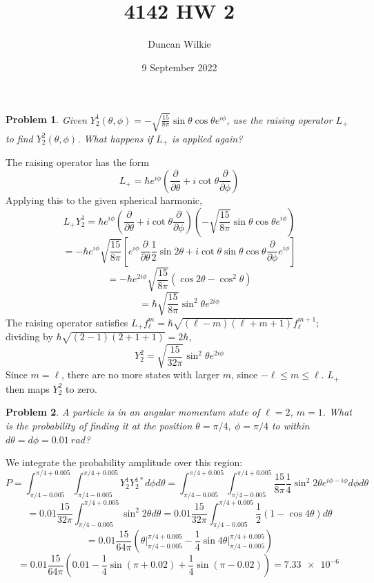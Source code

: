 \documentclass{article}
\title{4142 HW 2}
\author{Duncan Wilkie}
\date{9 September 2022}
\newtheorem{prob}{Problem}
\begin{document}
\maketitle

\begin{prob}
  Given $Y_{2}^{1}(\theta, \phi) = -\sqrt{\frac{15}{8\pi}} \sin\theta\cos\theta e^{i\phi}$, use the raising operator $L_{+}$ to find $Y_{2}^{2}(\theta, \phi)$.
  What happens if $L_{+}$ is applied again?
\end{prob}

The raising operator has the form
\[
  L_{+} = \hbar e^{i\phi}\left( \frac{\partial}{\partial\theta} + i\cot\theta\frac{\partial}{\partial\phi} \right)
\]
Applying this to the given spherical harmonic,
\[
  L_{+}Y_{2}^{1} = \hbar e^{i\phi}\left( \frac{\partial}{\partial\theta} + i\cot\theta\frac{\partial}{\partial\phi} \right)
  \left( -\sqrt{\frac{15}{8\pi}} \sin\theta\cos\theta e^{i\phi} \right)
\]
\[
  = -\hbar e^{i\phi}\sqrt{\frac{15}{8\pi}}\left[ e^{i\phi}\frac{\partial}{\partial\theta}\frac{1}{2}\sin 2\theta
    +i\cot\theta\sin\theta\cos\theta\frac{\partial}{\partial\phi}e^{i\phi}\right]
\]
\[
  = -\hbar e^{2i\phi}\sqrt{\frac{15}{8\pi}}\left( \cos 2\theta - \cos^{2}\theta \right)
\]
\[
  = \hbar\sqrt{\frac{15}{8\pi}} \sin^{2}\theta e^{2i\phi}
\]
The raising operator satisfies $L_{+}f_{\ell}^{m} = \hbar\sqrt{(\ell-m)(\ell+m+1)}f_{\ell}^{m+1}$; dividing by $\hbar\sqrt{(2 - 1)(2 + 1 + 1)} = 2\hbar$,
\[
  Y_{2}^{2} = \sqrt{\frac{15}{32\pi}} \sin^{2}\theta e^{2i\phi}
\]
Since $m = \ell$, there are no more states with larger $m$, since $-\ell \leq m \leq \ell$.
$L_{+}$ then maps $Y_{2}^{2}$ to zero.

\begin{prob}
  A particle is in an angular momentum state of $\ell = 2$, $m = 1$.
  What is the probability of finding it at the position $\theta = \pi / 4,\ \phi = \pi / 4$ to within $d\theta = d\phi = \SI{0.01}{rad}$?
\end{prob}

We integrate the probability amplitude over this region:
\[
  P = \int_{\pi / 4 - 0.005}^{\pi / 4 + 0.005}\int_{\pi / 4 - 0.005}^{\pi / 4 + 0.005}Y_{2}^{1}Y_{2}^{1*}d\phi d\theta
  = \int_{\pi / 4 - 0.005}^{\pi / 4 + 0.005}\int_{\pi / 4 - 0.005}^{\pi / 4 + 0.005}\frac{15}{8\pi} \frac{1}{4}\sin^{2}2\theta e^{i\phi-i\phi}d\phi d\theta
\]
\[
  = 0.01\frac{15}{32\pi}\int_{\pi / 4 - 0.005}^{\pi / 4 + 0.005} \sin^{2}2\theta d\theta
  = 0.01\frac{15}{32\pi}\int_{\pi / 4 - 0.005}^{\pi / 4 + 0.005} \frac{1}{2}\left( 1 - \cos 4\theta \right) d\theta
\]
\[
  = 0.01\frac{15}{64\pi}\left( \theta\bigg|_{\pi / 4 - 0.005}^{\pi / 4 + 0.005} - \frac{1}{4}\sin 4\theta\bigg|_{\pi / 4 - 0.005}^{\pi / 4 + 0.005}\right)
\]
\[
  = 0.01\frac{15}{64\pi}\left(  0.01 - \frac{1}{4}\sin(\pi + 0.02) + \frac{1}{4}\sin(\pi - 0.02)\right)
  = \SI{7.33e-6}{}
\]
\end{document}
